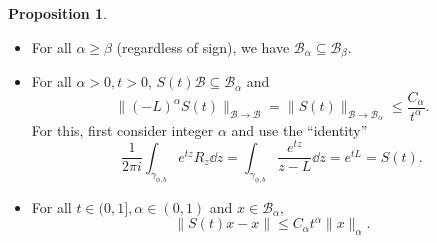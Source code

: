 \documentclass[]{article}
\theoremstyle{definition}
\theoremstyle{definition}
\newtheorem*{proposition}{Proposition}
\begin{document}
\begin{proposition}
  \begin{itemize}
    \item For all \(\alpha \ge \beta\) (regardless of sign), we have \(\mathcal{B}_\alpha \subseteq \mathcal{B}_\beta\).
    \item For all \(\alpha > 0, t > 0\), \(S(t)\mathcal{B} \subseteq \mathcal{B}_\alpha\) and 
      \[\|(-L)^\alpha S(t)\|_{\mathcal{B} \to \mathcal{B}} = \|S(t)\|_{\mathcal{B} \to \mathcal{B}_\alpha} \le \frac{C_\alpha}{t^\alpha}.\]
      For this, first consider integer \(\alpha\) and use the ``identity'' 
        \[\frac{1}{2\pi i} \int_{\gamma_{\phi, b}}e^{tz} R_z \dd z = \int_{\gamma_{\phi, b}}\frac{e^{tz}}{z - L} \dd z
          = e^{tL} = S(t).\]
    \item For all \(t \in (0, 1], \alpha \in (0, 1)\) and \(x \in \mathcal{B}_\alpha\), 
      \[\|S(t)x - x\| \le C_\alpha t^\alpha \|x\|_\alpha.\]
  \end{itemize}
\end{proposition}
\end{document}
